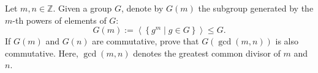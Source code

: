 \begin{problem}
    Let \( m,n\in\mathbb{Z} \). Given a group \( G \), denote by \( G\left(m\right) \) the subgroup generated by the \( m \)-th powers of elements of \( G \):
    \[
        G\left(m\right):=\left\langle\left\{g^m \mid g\in G\right\}\right\rangle\leq G.
    \]
    If \( G\left(m\right) \) and \( G\left(n\right) \) are commutative, prove that \( G\left(\gcd\left(m, n\right)\right) \) is also commutative. Here, \( \gcd\left(m, n\right) \) denotes the greatest common divisor of \( m \) and \( n \).
\end{problem}


